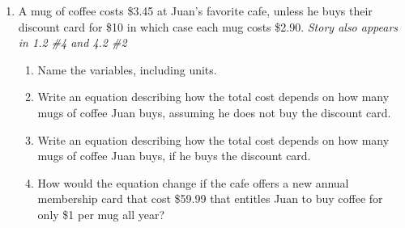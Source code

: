 \begin{enumerate}
\item  A mug of coffee costs \$3.45 at Juan's favorite cafe, unless he buys their discount card for \$10 in which case each mug costs  \$2.90.
    \hfill \emph{Story also appears in 1.2 \#4 and 4.2 \#2}
\begin{enumerate}
\item Name the variables, including units. \vfill
\item Write an equation describing how the total cost depends on how many mugs of coffee Juan buys, assuming he does not buy the discount card. \vfill
\item Write an equation describing how the total cost depends on how many mugs of coffee Juan buys, if he buys the discount card. \vfill
\item How would the equation change if the cafe offers a new annual membership card that cost \$59.99 that entitles Juan to buy coffee for only \$1 per mug all year? \vfill
\end{enumerate} 

\end{enumerate}


